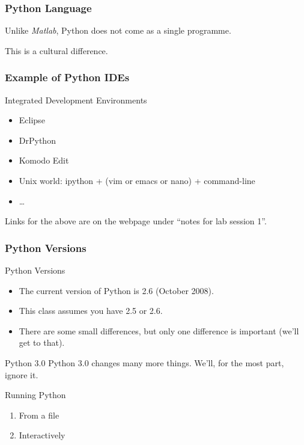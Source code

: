 \begin{frame}[fragile]
\frametitle{Python Language}

Unlike \textit{Matlab}, Python does not come as a single programme.

This is a cultural difference.

\end{frame}

\begin{frame}[fragile]
\frametitle{Example of Python IDEs}

\begin{block}{Integrated Development Environments}
\begin{itemize}
\item Eclipse
\item DrPython
\item Komodo Edit
\item Unix world: ipython + (vim or emacs or nano) + command-line
\item \ldots
\end{itemize}
\end{block}

Links for the above are on the webpage under ``notes for lab session 1''.
\end{frame}

\begin{frame}
\frametitle{Python Versions}

\begin{block}{Python Versions}
\begin{itemize}
\item The current version of Python is \alert{2.6} (October 2008).
\item This class assumes you have 2.5 or 2.6.
\item There are some small differences, but only one difference is important (we'll get to that).
\end{itemize}
\end{block}

\begin{block}{Python 3.0}
Python 3.0 changes many more things. We'll, for the most part, ignore it.
\end{block}
\end{frame}

\begin{frame}[fragile]

\begin{block}{Running Python}
\begin{enumerate}
\item From a file
\item Interactively
\end{enumerate}
\end{block}

\end{frame}


